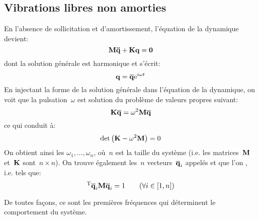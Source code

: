 \subsection{Vibrations libres non amorties}
En l'absence de sollicitation et d'amortissement, l'équation de la dynamique devient:
\begin{equation} \MM{M}\VV{\ddot{q}}+\MM{K}\VV{q}=\VV{0} \end{equation}
dont la solution générale est harmonique et s'écrit:
\begin{equation} \VV{q}=\VV{\overline{q}}\mathrm{e}^{i\omega t} \end{equation}
En injectant la forme de la solution générale dans l'équation de la dynamique, on voit que la
pulsation~$\omega$ est solution du problème de valeurs propres suivant:
\begin{equation} \MM{K}\VV{\overline{q}}=\omega^2\MM{M}\VV{\overline{q}} \end{equation}
ce qui conduit à:
\begin{equation} \det\left(\MM{K}-\omega^2\MM{M}\right)=0\end{equation}
\medskipvm
On obtient ainsi les 
$\omega_1,\ldots,\omega_n$, où~$n$ est la taille du système (i.e. les matrices~$\MM{M}$ et~$\MM{K}$ sont~$n\times n$).
\medskipvm
On trouve également les~$n$ vecteurs~$\VV{\overline{q}}_i$ appelés  et que l'on , i.e. tels que:
\begin{equation} \LL{\overline{q}}_i\MM{M}\VV{\overline{q}}_i=1 \qquad (\forall i\in[1,n]) \end{equation}
\medskipvm
{}

De toutes façons, ce sont les premières fréquences qui déterminent le comportement du système.

\medskip
{}
